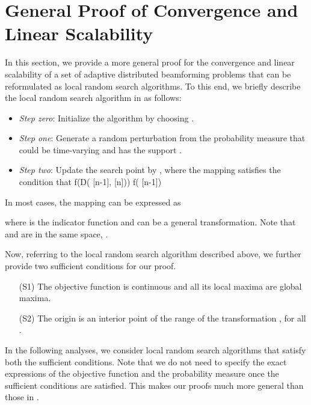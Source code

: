 \documentclass{article}
\newcommand{\beq}{}
\newcommand{\thetabm}{ {\boldsymbol{\theta}} }
\newcommand{\deltabm}{ {\boldsymbol{\delta}} }
\begin{document}
\vspace{-0.10cm}
\section{General Proof of Convergence and Linear Scalability}\label{sec:pf}
\vspace{-0.20cm}
In this section, we provide a more general proof for the convergence and linear scalability of a set of adaptive distributed beamforming problems that can be reformulated as local random search algorithms. 
To this end, we briefly describe the local random search algorithm in \cite{Lin10} as follows:
\begin{itemize}

\item \emph{Step zero}: Initialize the algorithm by choosing .

\item \emph{Step one}: Generate a random perturbation  from the probability measure  that could be time-varying and has the support . 

\item \emph{Step two}: Update the search point by , where the mapping  satisfies the condition that
\beq\nonumber
f(D(\thetabm[n-1],\deltabm[n])) \geq f(\thetabm[n-1]) 
\eeq

\end{itemize}
In most cases, the mapping  can be expressed as

where  is the indicator function and  can be a general transformation. Note that  and  are in the same space, .

Now, referring to the local random search algorithm described above, we further provide two sufficient conditions for our proof.

\begin{enumerate}

\item[(S1)] The objective function  is continuous and all its local maxima are global maxima. 
\item[(S2)] The origin is an interior point of the range of the transformation , for all .

\end{enumerate}
In the following analyses, we consider local random search algorithms that satisfy both the sufficient conditions. 
Note that we do not need to specify the exact expressions of the objective function and the probability measure once the sufficient conditions are satisfied. This makes our proofs much more general than those in \cite{Lin10}.
\end{document}
